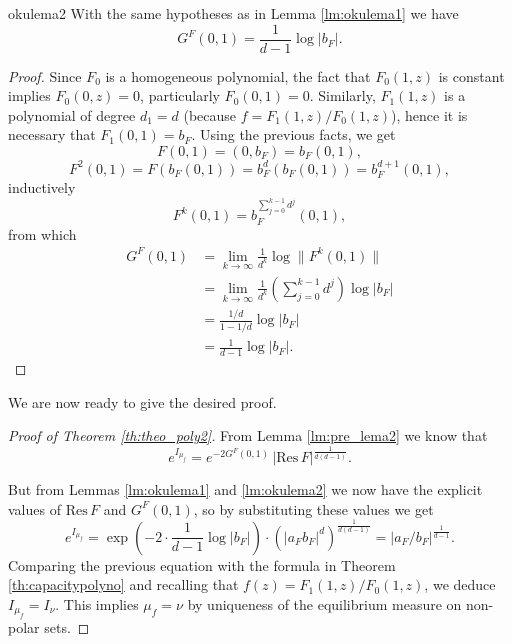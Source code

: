 \begin{mylema}{}{okulema2}
With the same hypotheses as in Lemma \ref{lm:okulema1} we have
\begin{equation}\label{G-F}
G^F(0,1) = \frac{1}{d-1} \log|b_F|.
\end{equation}
\end{mylema}

\begin{proof}
Since $F_0$ is a homogeneous polynomial, the fact that $F_0(1,z)$ is constant implies $F_0(0,z)=0$, particularly $F_0(0,1)=0$. Similarly, $F_1(1,z)$ is a polynomial of degree $d_1=d$ (because $f=F_1(1,z)/F_0(1,z)$), hence it is necessary that $F_1(0,1)=b_F$. Using the previous facts, we get
$$F(0,1) = (0,b_F) = b_F(0,1),$$
$$F^2(0,1) = F(b_F(0,1))= b_F^d(b_F(0,1)) = b_F^{d+1}(0,1),$$
inductively
$$F^k(0,1) = b_F^{\sum_{j=0}^{k-1}d^j}(0,1),$$
from which
\begin{align*}
G^F(0,1) &= \lim_{k \rightarrow \infty} \frac{1}{d^k} \log \|F^k(0,1)\|\\
&= \lim_{k \rightarrow \infty} \frac{1}{d^k}(\sum_{j=0}^{k-1}d^j) \log|b_F|\\
&= \frac{1/d}{1-1/d} \log|b_F|\\
&= \frac{1}{d-1} \log|b_F|.
\end{align*}
\end{proof}

We are now ready to give the desired proof.

\begin{proof}[Proof of Theorem \ref{th:theo_poly2}] 

From Lemma \ref{lm:pre_lema2} we know that
$$e^{I_{\mu_f}} = e^{-2G^F(0,1)} \,|\text{Res}\, F|^{\frac{1}{d(d-1)}}.$$

But from Lemmas \ref{lm:okulema1} and \ref{lm:okulema2} we now have the explicit values of $\text{Res}\,F$ and $G^F(0,1)$, so by substituting these values we get
\begin{equation}\label{energia}
e^{I_{\mu_f}} = \exp\left(-2\cdot \frac{1}{d-1} \log|b_F|\right) \cdot (|a_F b_F|^d)^{\frac{1}{d(d-1)}} = |a_F/b_F|^{\frac{1}{d-1}}.
\end{equation}
Comparing the previous equation with the formula in Theorem \ref{th:capacitypolyno} and recalling that $f(z)=F_1(1,z)/F_0(1,z)$, we deduce $I_{\mu_f}=I_\nu$. This implies $\mu_f=\nu$ by uniqueness of the equilibrium measure on non-polar sets.
\end{proof}